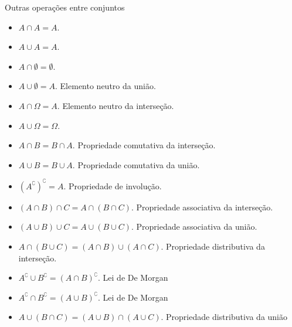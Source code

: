 \begin{frame}
 \begin{block}{Outras operações entre conjuntos}
 \begin{itemize}
   \item  $A \cap A = A.$
   \item $A \cup A = A.$
   \item $A \cap \emptyset = \emptyset.$
   \item $A \cup \emptyset = A.$ Elemento neutro da união.
   \item $A \cap \Omega= A.$ Elemento neutro da interseção.
   \item $A \cup \Omega = \Omega.$
   \item $A \cap B = B \cap A.$ Propriedade comutativa da interseção.
   \item $A \cup B = B \cup A.$ Propriedade comutativa da união.
   \item $\left(A^\complement\right)^\complement = A.$ Propriedade de involução.
   \item $(A \cap B) \cap C = A \cap (B \cap C).$ Propriedade associativa da interseção.
   \item $(A \cup B) \cup C = A \cup (B \cup C).$ Propriedade associativa da união.
   \item $A \cap (B \cup C) = (A \cap B) \cup (A \cap C).$ Propriedade distributiva da interseção.
   \item $A^\complement \cup B^\complement = (A \cap B)^\complement.$ Lei de De Morgan
   \item $A^\complement \cap B^\complement = (A \cup B)^\complement.$ Lei de De Morgan
   \item $A \cup (B \cap C) = (A \cup B) \cap (A \cup C).$ Propriedade distributiva da união
  \end{itemize}  
 \end{block}

\end{frame}

